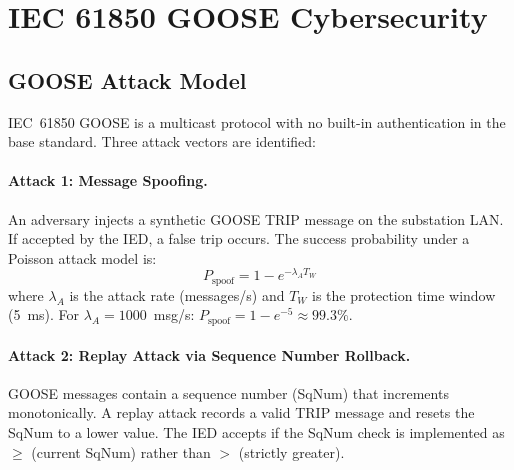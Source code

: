 
\section{IEC 61850 GOOSE Cybersecurity}
\label{sec:ch9_security}

\subsection{GOOSE Attack Model}

IEC~61850 GOOSE is a multicast protocol with no built-in authentication
in the base standard. Three attack vectors are identified:

\paragraph{Attack 1: Message Spoofing.}
An adversary injects a synthetic GOOSE TRIP message on the substation LAN.
If accepted by the IED, a false trip occurs. The success probability
under a Poisson attack model is:
\begin{equation}
  P_\mathrm{spoof} = 1 - e^{-\lambda_A T_W}
  \label{eq:ch9_spoof_prob}
\end{equation}
where $\lambda_A$ is the attack rate (messages/s) and $T_W$ is the
protection time window (5~ms). For $\lambda_A = 1000$~msg/s:
$P_\mathrm{spoof} = 1 - e^{-5} \approx 99.3\%$.

\paragraph{Attack 2: Replay Attack via Sequence Number Rollback.}
GOOSE messages contain a sequence number (SqNum) that increments
monotonically. A replay attack records a valid TRIP message and resets
the SqNum to a lower value. The IED accepts if the SqNum check is
implemented as $\geq$ (current SqNum) rather than $>$ (strictly greater).

